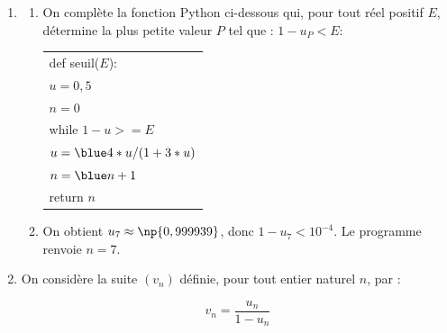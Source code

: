 \begin{enumerate}
\begin{enumerate}
$\begin{gathered}f(\ell) = \ell \iff \dfrac{4\ell}{1 + 3\ell} = \ell 
\iff 4\ell = \ell(1 + 3\ell) 
\iff 0 = \ell(1 + 3\ell - 4) \\
\phantom{f(\ell) = \ell}
\iff \ell(3\ell - 3) = 0 \iff 3\ell(\ell - 1) = 0 \iff 
\left[\begin{array}{l !{=} l}
\ell&0 \\
\multicolumn{2}{c}{\text{ou}}\\
\ell - 1 & 0
\end{array}\right. \iff 
\left[\begin{array}{l !{=} l}
\ell&0\\
\multicolumn{2}{c}{\text{ou}}\\
\ell&1
\end{array}\right. \end{gathered}$	
\end{enumerate}

Comme $\ell \geqslant \dfrac{1}{2}$, la seule solution possible est 1;
la suite $\left(u_n\right)$ converge vers 1.

\item 
	\begin{enumerate}
		\item On  complète la fonction Python ci-dessous qui, pour tout réel positif $E$, détermine la plus petite valeur $P$ tel que : $1 - u_{P} < E$:
		
\begin{center}
\begin{tabularx}{0.4\linewidth}{|X|}\hline
def seuil($E$):\\
\quad $u = 0,5$\\
\quad $n = 0$ \\
\quad  while $1 - u > = E$\\
\quad \quad $u = \blue 4*u/(1 + 3*u)$\\
\quad \quad $n = \blue n + 1$\\
\quad return $n$\\ \hline
\end{tabularx}
\end{center}
		\item 
On obtient $u_7 \approx \np{0,999939}$, donc $1 - u_7 < 10^{-4}$. Le programme renvoie $n = 7$.
	\end{enumerate}
\item On considère la suite $\left(v_n\right)$ définie, pour tout entier naturel $n$, par :

\[v_n  = \dfrac{u_n}{1 - u_n}\]


\end{enumerate}

